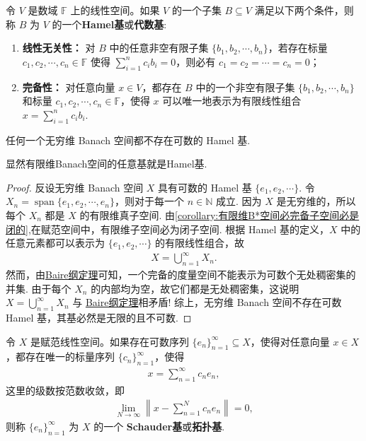 \documentclass[../../main.tex]{subfiles}%
\begin{document}
\begin{definition}[Hamel基]
令 \(V\) 是数域 \(\mathbb{F}\) 上的线性空间。如果 \(V\) 的一个子集 \(B \subseteq V\) 满足以下两个条件，则称 \(B\) 为 \(V\) 的一个\textbf{Hamel基}或\textbf{代数基}:
\begin{enumerate}[(1)]
\item \textbf{线性无关性：} 对 \(B\) 中的任意非空有限子集 \(\{b_1, b_2, \cdots, b_n\}\)，若存在标量 \(c_1, c_2, \cdots, c_n \in \mathbb{F}\) 使得 \(\sum\limits_{i=1}^{n} c_i b_i = 0\)，则必有 \(c_1 = c_2 = \cdots = c_n = 0\)；

\item \textbf{完备性：} 对任意向量 \(x \in V\)，都存在 \(B\) 中的一个非空有限子集 \(\{b_1, b_2, \cdots, b_n\}\) 和标量 \(c_1, c_2, \cdots, c_n \in \mathbb{F}\)，使得 \(x\) 可以唯一地表示为有限线性组合 \(x = \sum\limits_{i=1}^{n} c_i b_i\).
\end{enumerate}
\end{definition}

\begin{proposition}
任何一个无穷维 Banach 空间都不存在可数的 Hamel 基.
\end{proposition}
\begin{remark}
显然有限维Banach空间的任意基就是Hamel基.
\end{remark}
\begin{proof}
反设无穷维 Banach 空间 \(X\) 具有可数的 Hamel 基 \(\{e_1, e_2, \cdots\}\).
令 \(X_n = \operatorname{span}\{e_1, e_2, \cdots, e_n\}\)，则对于每一个 \(n \in \mathbb{N}\) 成立. 因为 \(X\) 是无穷维的，所以每个 \(X_n\) 都是 \(X\) 的有限维真子空间. 由\cref{corollary:有限维B*空间必完备子空间必是闭的},在赋范空间中，有限维子空间必为闭子空间.
根据 Hamel 基的定义，\(X\) 中的任意元素都可以表示为 \(\{e_1, e_2, \cdots\}\) 的有限线性组合，故
\begin{align*}
X = \bigcup\limits_{n=1}^{\infty} X_n.
\end{align*}
然而，由\hyperref[theorem:泛函分析--Baire纲定理]{Baire纲定理}可知，一个完备的度量空间不能表示为可数个无处稠密集的并集. 由于每个 \(X_n\) 的内部均为空，故它们都是无处稠密集，这说明 \(X = \bigcup\limits_{n=1}^{\infty} X_n\) 与 \hyperref[theorem:泛函分析--Baire纲定理]{Baire纲定理}相矛盾!
综上，无穷维 Banach 空间不存在可数 Hamel 基，其基必然是无限的且不可数.
\end{proof}

\begin{definition}[Schauder基]
令 \(X\) 是赋范线性空间。如果存在可数序列 \(\{e_n\}_{n=1}^{\infty} \subseteq X\)，使得对任意向量 \(x \in X\)，都存在唯一的标量序列 \(\{c_n\}_{n=1}^{\infty}\)，使得
\begin{align*}
x = \sum\limits_{n=1}^{\infty} c_n e_n,
\end{align*}
这里的级数按范数收敛，即
\begin{align*}
\lim\limits_{N \to \infty} \left\| x - \sum\limits_{n=1}^{N} c_n e_n \right\| = 0,
\end{align*}
则称 \(\{e_n\}_{n=1}^{\infty}\) 为 \(X\) 的一个 \textbf{Schauder基}或\textbf{拓扑基}.
\end{definition}
\end{document}
